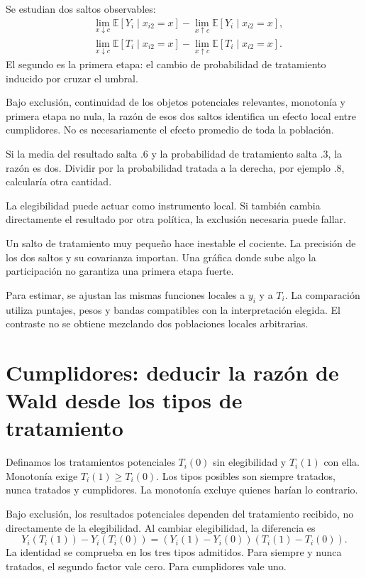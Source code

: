 \documentclass[11pt,a4paper]{article}
\newcommand{\E}{\mathbb E}
\begin{document}
Se estudian dos saltos observables:
\[
\begin{aligned}
&\lim_{x\downarrow c}\E[Y_i\mid x_{i2}=x]
-\lim_{x\uparrow c}\E[Y_i\mid x_{i2}=x],\\
&\lim_{x\downarrow c}\E[T_i\mid x_{i2}=x]
-\lim_{x\uparrow c}\E[T_i\mid x_{i2}=x].
\end{aligned}
\]
El segundo es la primera etapa:
el cambio de probabilidad de tratamiento
inducido por cruzar el umbral.

Bajo exclusión, continuidad de los objetos
potenciales relevantes, monotonía y
primera etapa no nula,
la razón de esos dos saltos identifica
un efecto local entre cumplidores.
No es necesariamente el efecto
promedio de toda la población.

\begin{ejemplo}
Si la media del resultado salta .6
y la probabilidad de tratamiento salta .3,
la razón es dos.
Dividir por la probabilidad tratada
a la derecha, por ejemplo .8,
calcularía otra cantidad.
\end{ejemplo}
La elegibilidad puede actuar como
instrumento local. Si también cambia
directamente el resultado por otra política,
la exclusión necesaria puede fallar.

Un salto de tratamiento muy pequeño
hace inestable el cociente.
La precisión de los dos saltos
y su covarianza importan.
Una gráfica donde sube algo
la participación no garantiza
una primera etapa fuerte.

Para estimar, se ajustan las mismas
funciones locales a \(y_i\)
y a \(T_i\). La comparación utiliza
puntajes, pesos y bandas compatibles
con la interpretación elegida.
El contraste no se obtiene mezclando
dos poblaciones locales arbitrarias.

\clearpage
\section{Cumplidores: deducir la razón de Wald desde los tipos de tratamiento}\label{unidad43}
Definamos los tratamientos potenciales
\(T_i(0)\) sin elegibilidad y \(T_i(1)\) con ella.
Monotonía exige
\(T_i(1)\ge T_i(0)\).
Los tipos posibles son siempre tratados,
nunca tratados y cumplidores.
La monotonía excluye quienes harían lo contrario.

Bajo exclusión, los resultados potenciales
dependen del tratamiento recibido,
no directamente de la elegibilidad.
Al cambiar elegibilidad, la diferencia es
\[
Y_i(T_i(1))-Y_i(T_i(0))
=(Y_i(1)-Y_i(0))(T_i(1)-T_i(0)).
\]
La identidad se comprueba en los
tres tipos admitidos.
Para siempre y nunca tratados,
el segundo factor vale cero.
Para cumplidores vale uno.
\end{document}
